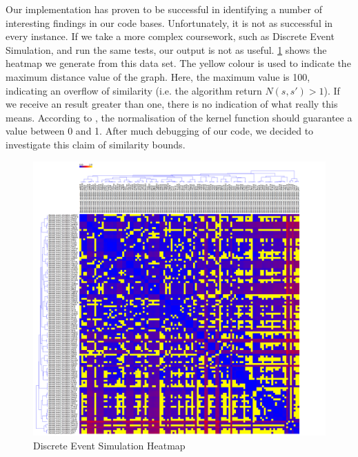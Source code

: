 


Our implementation has proven to be successful in identifying a number of
interesting findings in our code bases. Unfortunately, it is not as successful
in every instance. If we take a more complex coursework, such as Discrete
Event Simulation, and run the same tests, our output is not as useful. 
\cref{fig:DESHeatmap} shows the heatmap we generate from this data set. The
yellow colour is used to indicate the maximum distance value of the graph. Here,
the maximum value is 100, indicating an overflow of similarity (i.e. the algorithm
return $N(s, s') > 1$). If we receive an result greater than one, there is no
indication of what really this means. According to \cite{ParseTreeKernel},
the normalisation of the kernel function should guarantee a value between 0
and 1. After much debugging of our code, we decided to investigate this claim
of similarity bounds. 

\begin{figure}[h!]

	\centering
		\includegraphics[width=1.2\textwidth]{Figures/DESHeatmapOverflow}
	\caption{Discrete Event Simulation Heatmap}
	\label{fig:DESHeatmap}

\end{figure}

